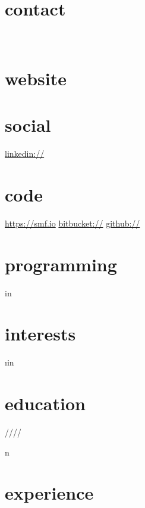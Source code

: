 \documentclass[]{fancy-cv}
\begin{document}
\header{\MakeLowercase\myfirstname}{\MakeLowercase\mylastname}
       {\MakeLowercase\mytitle}

\begin{aside}
  \section{contact}
    \href{mailto:\myemail}{\myemail}
    ~
    \myphone
    ~
    \myaddress%
    \mycity
  \section{website}
    \href{\mywebsite}{\mywebsite}
  \section{social}
    \href{http://www.linkedin.com/in/\mylinkedin}{linkedin://\mylinkedin}
  \section{code}
    \href{https://smf.io}{https://smf.io}
    \href{https://bitbucket.org/\myfb}{bitbucket://\myfb}
    \href{https://github.com/\myfb}{github://\myfb}
  \section{programming}
     \lang in \programming {%
      \lang
    }%
  \section{interests}
     \i in \interests {%
      \MakeLowercase\i
    }%
\end{aside}

\section{education}
\label{sec:education}

\begin{entrylist}
   \year/\degree/\school/\city/\subtitle in \education {
    \entry{\year}{\degree}{\school}{\subtitle}
  }
\end{entrylist}

\section{experience}
\label{sec:experience}
\end{document}

